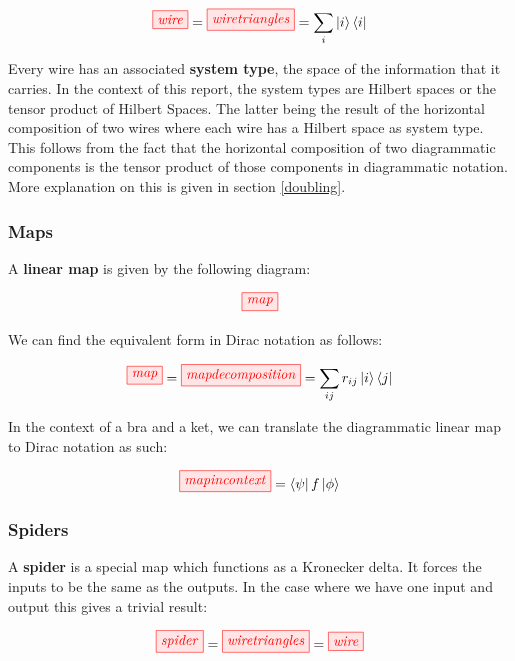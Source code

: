 \documentclass[]{article}
\begin{document}
\begin{equation}
\tikzfig{wire} = \tikzfig{wiretriangles} = \sum_{i}\ket{i}\bra{i}
\end{equation}

Every wire has an associated \textbf{system type}, the space of the information that it carries. In the context of this report, the system types are Hilbert spaces or the tensor product of Hilbert Spaces. The latter being the result of the horizontal composition of two wires where each wire has a Hilbert space as system type. This follows from the fact that the horizontal composition of two diagrammatic components is the tensor product of those components in diagrammatic notation. More explanation on this is given in section \ref{doubling}.

\subsubsection{Maps}
\label{maps}

A \textbf{linear map} is given by the following diagram:

\begin{equation}
\tikzfig{map}
\end{equation}

We can find the equivalent form in Dirac notation as follows:

\begin{equation}
\tikzfig{map} = \tikzfig{mapdecomposition} = \sum_{ij}r_{ij}\ket{i}\bra{j}
\end{equation}

In the context of a bra and a ket, we can translate the diagrammatic linear map to Dirac notation as such:

\begin{equation}
\tikzfig{mapincontext} = \bra{\psi}f\ket{\phi}
\end{equation}

\subsubsection{Spiders}
\label{spiders}

A \textbf{spider} is a special map which functions as a Kronecker delta. It forces the inputs to be the same as the outputs. In the case where we have one input and output this gives a trivial result:

\begin{equation}
\tikzfig{spider} = \tikzfig{wiretriangles} = \tikzfig{wire}
\end{equation}
\end{document}
